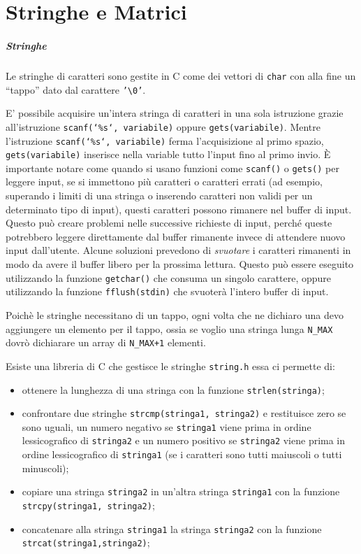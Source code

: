 \documentclass[oneside]{scrbook}
\begin{document}
\chapter{Stringhe e Matrici}

\paragraph{Stringhe}
Le stringhe di caratteri sono gestite in C come dei vettori di \texttt{char} con alla fine un ``tappo'' dato dal carattere \texttt{'\textbackslash0'}. 

E' possibile acquisire un'intera stringa di caratteri in una sola istruzione grazie all'istruzione \texttt{scanf(`\%s`, variabile)} oppure \texttt{gets(variabile)}. Mentre l'istruzione \texttt{scanf(`\%s`, variabile)} ferma l'acquisizione al primo spazio,  
\texttt{gets(variabile)} inserisce nella variable tutto l'input fino al primo invio. \`E importante notare come quando si usano funzioni come \texttt{scanf()} o \texttt{gets()} per leggere input, se si immettono più caratteri o caratteri errati (ad esempio, superando i limiti di una stringa o inserendo caratteri non validi per un determinato tipo di input), questi caratteri possono rimanere nel buffer di input. Questo può creare problemi nelle successive richieste di input, perché queste potrebbero leggere direttamente dal buffer rimanente invece di attendere nuovo input dall'utente. Alcune soluzioni prevedono di \emph{svuotare} i caratteri rimanenti in modo da avere il buffer libero per la prossima lettura. Questo può essere eseguito utilizzando la funzione \texttt{getchar()} che consuma un singolo carattere, oppure utilizzando la funzione \texttt{fflush(stdin)} che svuoterà l'intero buffer di input.



Poich\`e le stringhe necessitano di un tappo, ogni volta che ne dichiaro una devo aggiungere un elemento per il tappo, ossia se voglio una stringa lunga \texttt{N\_MAX} dovr\`o dichiarare un array di \texttt{N\_MAX+1} elementi.

Esiste una libreria di C che gestisce le stringhe \texttt{string.h} essa ci permette di:
\begin{itemize}
		\item ottenere la lunghezza di una stringa con la funzione \texttt{strlen(stringa)};
		\item confrontare due stringhe \texttt{strcmp(stringa1, stringa2)} e restituisce zero se sono uguali, un numero negativo se \texttt{stringa1} viene prima in ordine lessicografico di \texttt{stringa2} e un numero positivo se \texttt{stringa2} viene prima in ordine lessicografico di \texttt{stringa1} (se i caratteri sono tutti maiuscoli o tutti minuscoli);
		\item copiare una stringa \texttt{stringa2} in un'altra stringa \texttt{stringa1} con la funzione\\
		\texttt{strcpy(stringa1, stringa2)};
		\item concatenare alla stringa \texttt{stringa1} la stringa \texttt{stringa2} con la funzione\\
		\texttt{strcat(stringa1,stringa2)};
\end{itemize}
\end{document}
